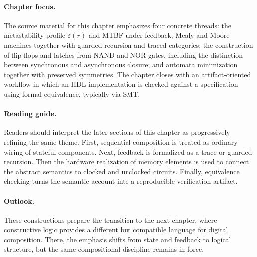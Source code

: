 \paragraph{Chapter focus.} The source material for this chapter emphasizes four concrete threads: the metastability profile \(\varepsilon(r)\) and MTBF under feedback; Mealy and Moore machines together with guarded recursion and traced categories; the construction of flip-flops and latches from NAND and NOR gates, including the distinction between synchronous and asynchronous closure; and automata minimization together with preserved symmetries. The chapter closes with an artifact-oriented workflow in which an HDL implementation is checked against a specification using formal equivalence, typically via SMT.

\paragraph{Reading guide.} Readers should interpret the later sections of this chapter as progressively refining the same theme. First, sequential composition is treated as ordinary wiring of stateful components. Next, feedback is formalized as a trace or guarded recursion. Then the hardware realization of memory elements is used to connect the abstract semantics to clocked and unclocked circuits. Finally, equivalence checking turns the semantic account into a reproducible verification artifact.

\paragraph{Outlook.} These constructions prepare the transition to the next chapter, where constructive logic provides a different but compatible language for digital composition. There, the emphasis shifts from state and feedback to logical structure, but the same compositional discipline remains in force.
